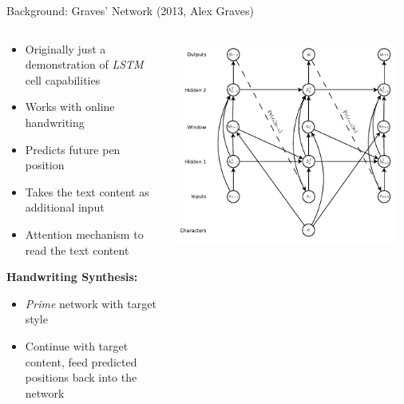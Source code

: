 \documentclass[aspectratio=169]{beamer}
\begin{document}
\begin{frame}{Background: Graves' Network (2013, Alex Graves)}
\begin{columns}
\begin{column}{0.45\textwidth}
    \begin{itemize}
    \item Originally just a demonstration of \emph{LSTM} cell capabilities
    \item Works with online handwriting
    \item Predicts future pen position
    \item Takes the text content as additional input
    \item Attention mechanism to read the text content
    \end{itemize}
    \vspace{1em}
    \textbf{Handwriting Synthesis:}
    \begin{itemize}
    \item \emph{Prime} network with target style
    \item Continue with target content, feed predicted positions back into the network
    \end{itemize}
\end{column}
\begin{column}{0.50\textwidth}
    \begin{center}
    \vspace{-1em}
    \includegraphics[width=0.95\textwidth]{../thesis/assets/style_transfer/graves_synthesis_network.pdf}
    \end{center}
\end{column}
\end{columns}
\end{frame}
\end{document}
